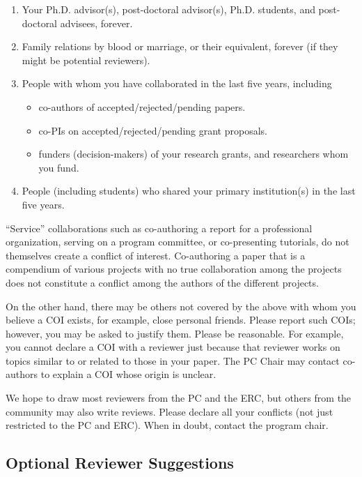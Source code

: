 \documentclass[pageno]{jpaper}
\begin{document}
\begin{enumerate}
\item Your Ph.D. advisor(s), post-doctoral advisor(s), Ph.D. students, 
      and post-doctoral advisees, forever. 
\item Family relations by blood or marriage, or their equivalent, 
      forever (if they might be potential reviewers).
\item People with whom you have collaborated in the last five years, including 
\begin{itemize}
\item co-authors of accepted/rejected/pending papers.
\item co-PIs on accepted/rejected/pending grant proposals.
\item funders (decision-makers) of your research grants, and researchers 
      whom you fund. 
\end{itemize}
\item People (including students) who shared your primary institution(s) in the 
last five years. 
\end{enumerate}

``Service'' collaborations such as co-authoring a report for a professional 
organization, serving on a program committee, or co-presenting 
tutorials, do not themselves create a conflict of interest. 
Co-authoring a paper that is a compendium of various projects with 
no true collaboration among the projects does not constitute a 
conflict among the authors of the different projects.

On the other hand, there may be others not covered by the above	with whom 
you believe a COI exists, for example, close personal friends. 
Please report such COIs; however, you may be asked to justify them. 
Please be reasonable.	For example, you cannot declare a COI with a 
reviewer just because that reviewer works on topics similar to or 
related to those in your paper.	
The PC Chair may contact co-authors to explain a COI whose origin is unclear. 

We hope to draw most reviewers from the PC and the ERC, but others from the
community may also write reviews.  Please declare all your conflicts (not
just restricted to the PC and ERC).  When in doubt, contact the program
chair.


\subsection{Optional Reviewer Suggestions}
\end{document}
